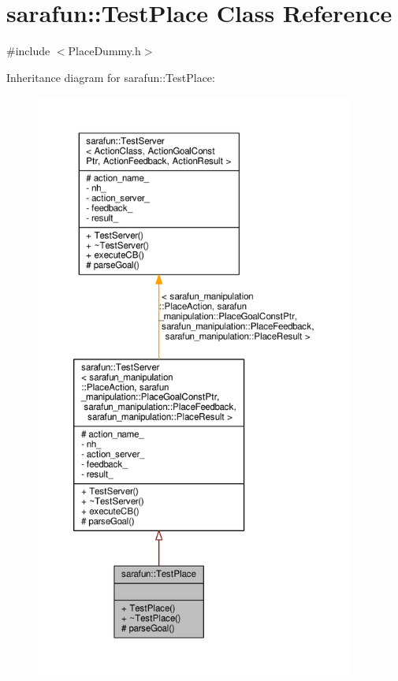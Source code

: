 \hypertarget{classsarafun_1_1TestPlace}{\section{sarafun\-:\-:Test\-Place Class Reference}
\label{classsarafun_1_1TestPlace}
}


{\ttfamily \#include $<$Place\-Dummy.\-h$>$}



Inheritance diagram for sarafun\-:\-:Test\-Place\-:
\nopagebreak
\begin{figure}[H]
\begin{center}
\leavevmode
\includegraphics[height=550pt]{d6/d54/classsarafun_1_1TestPlace__inherit__graph}
\end{center}
\end{figure}


